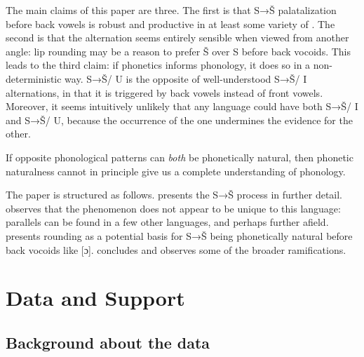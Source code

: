 \documentclass[output=paper,newtxmath,modfonts,nonflat]{langsci/langscibook}
\begin{document}
The main claims of this paper are three. The first is that S→Š palatalization before back vowels is robust and productive in at least some variety of . The second is that the alternation seems entirely sensible when viewed from another angle: lip rounding may be a reason to prefer Š over S before back vocoids. This leads to the third claim: if phonetics informs phonology, it does so in a non-deterministic way. S→Š/ {\longrule} U is the opposite of well-understood S→Š/ {\longrule} I alternations, in that it is triggered by back vowels instead of front vowels. Moreover, it seems intuitively unlikely that any language could have both S→Š/ {\longrule} I and S→Š/ {\longrule} U, because the occurrence of the one undermines the evidence for the other. 

If opposite phonological patterns can \textit{both} be phonetically natural, then phonetic naturalness cannot in principle give us a complete understanding of phonology.

The paper is structured as follows.  presents the  S→Š process in further detail.  observes that the phenomenon does not appear to be unique to this language: parallels can be found in a few other  languages, and perhaps further afield.  presents rounding as a potential basis for S→Š being phonetically natural before back vocoids like [ɔ].  concludes and observes some of the broader ramifications.

\section{Data and Support}\label{sec:bennett:2}

\subsection{Background about the data}\label{sec:bennett:2.1}
\end{document}

